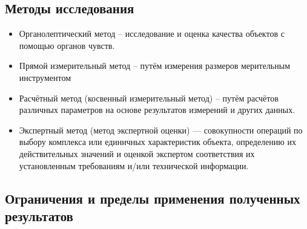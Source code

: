 \subsection{Методы исследования}
\begin{itemize}
\item  Органолептический метод – исследование и оценка качества объектов с помощью органов чувств.
\item 	Прямой измерительный метод – путём измерения  размеров  %
мерительным инструментом %
\item Расчётный метод (косвенный измерительный метод) – путём расчётов различных параметров на основе результатов измерений и других данных.
\item Экспертный метод (метод экспертной оценки) — совокупности операций по выбору комплекса или единичных характеристик объекта, определению их действительных значений и оценкой экспертом соответствия их установленным требованиям и/или технической информации.
\end{itemize}
%
%
\subsection{Ограничения и пределы применения полученных результатов}

